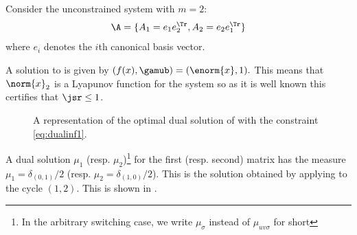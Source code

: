 \documentclass[11pt,twoside,a4paper,openright]{uclouvain-thesis}
\begin{document}
\begin{myexem}
  \label{exem:simple0}
  Consider the unconstrained system \cite[Example~2.1]{ahmadi2012joint} with $m=2$:
  \[ \A = \{ A_1 = e_1e_2^\Tr , A_2 = e_2e_1^\Tr  \} \]
  where $e_i$ denotes the $i$th canonical basis vector.

  A solution to  is given by
  \( (f(x), \gamub) = (\enorm{x}, 1). \)
  This means that $\norm{x}_2$ is a Lyapunov function for the system so as it is well known
  this certifies that $\jsr \leq 1$.

  \begin{figure}[!ht]
    \centering
    \caption{A representation of the optimal dual solution of  with the constraint \eqref{eq:dualinf1}.}
    \label{fig:simple0}
  \end{figure}

  A dual solution $\mu_1$ (resp. $\mu_2$)\footnote{In the arbitrary switching case, we write $\mu_\sigma$ instead of $\mu_{uv\sigma}$ for short}
  for the first (resp. second) matrix has the measure $\mu_1 = \delta_{(0,1)}/2$ (resp. $\mu_2 = \delta_{(1,0)}/2$).
  This is the solution obtained by applying  to the cycle $(1, 2)$.
  This is shown in .

\end{myexem}
\end{document}
